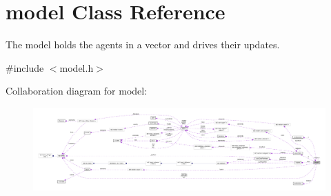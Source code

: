 \hypertarget{classmodel}{}\section{model Class Reference}
\label{classmodel}


The model holds the agents in a vector and drives their updates.  




{\ttfamily \#include $<$model.\+h$>$}



Collaboration diagram for model\+:
\nopagebreak
\begin{figure}[H]
\begin{center}
\leavevmode
\includegraphics[width=350pt]{classmodel__coll__graph}
\end{center}
\end{figure}
